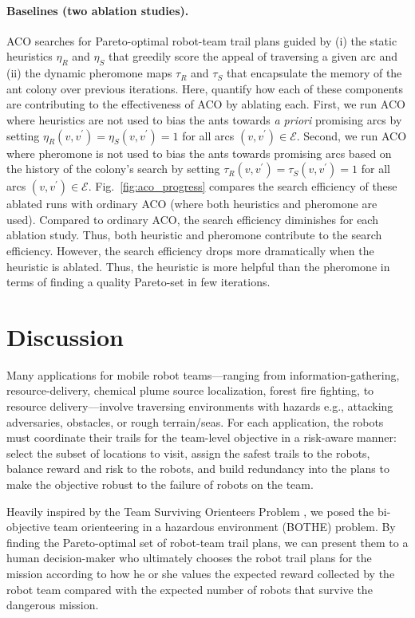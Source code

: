 \documentclass[11pt, oneside]{article}
\begin{document}
\paragraph{Baselines (two ablation studies).}
ACO searches for Pareto-optimal robot-team trail plans guided by (i) the static heuristics $\eta_R$ and $\eta_S$ that greedily score the appeal of traversing a given arc and (ii) the dynamic pheromone maps $\tau_R$ and $\tau_S$ that encapsulate the memory of the ant colony over previous iterations. Here, quantify how each of these components are contributing to the effectiveness of ACO by ablating each. 
First, we run ACO where heuristics are not used to bias the ants towards \emph{a priori} promising arcs by setting $\eta_R(v, v^\prime)=\eta_S(v, v^\prime)=1$ for all arcs $(v, v^\prime)\in \mathcal{E}$. Second, we run ACO where pheromone is not used to bias the ants towards promising arcs based on the history of the colony's search by setting $\tau_R(v, v^\prime)=\tau_S(v, v^\prime)=1$ for all arcs $(v, v^\prime)\in \mathcal{E}$.
Fig.~\ref{fig:aco_progress} compares the search efficiency of these ablated runs with ordinary ACO (where both heuristics and pheromone are used).
Compared to ordinary ACO, the search efficiency diminishes for each ablation study. 
Thus, both heuristic and pheromone contribute to the search efficiency.
However, the search efficiency drops more dramatically when the heuristic is ablated. 
Thus, the heuristic is more helpful than the pheromone in terms of finding a quality Pareto-set in few iterations. 

\section{Discussion}
Many applications for mobile robot teams---ranging from information-gathering, resource-delivery, chemical plume source localization, forest fire fighting, to resource delivery---involve traversing environments with hazards e.g., attacking adversaries, obstacles, or rough terrain/seas. 
For each application, the robots must coordinate their trails for the team-level objective in a risk-aware manner: select the subset of locations to visit, assign the safest trails to the robots, balance reward and risk to the robots, and build redundancy into the plans to make the objective robust to the failure of robots on the team. 

Heavily inspired by the Team Surviving Orienteers Problem \cite{jorgensen2018team,jorgensen2017matroid,jorgensen2024matroid}, we posed the bi-objective team orienteering in a hazardous environment (BOTHE) problem. 
By finding the Pareto-optimal set of robot-team trail plans, we can present them to a human decision-maker who ultimately chooses the robot trail plans for the mission according to how he or she values the expected reward collected by the robot team compared with the expected number of robots that survive the dangerous mission.
\end{document}
